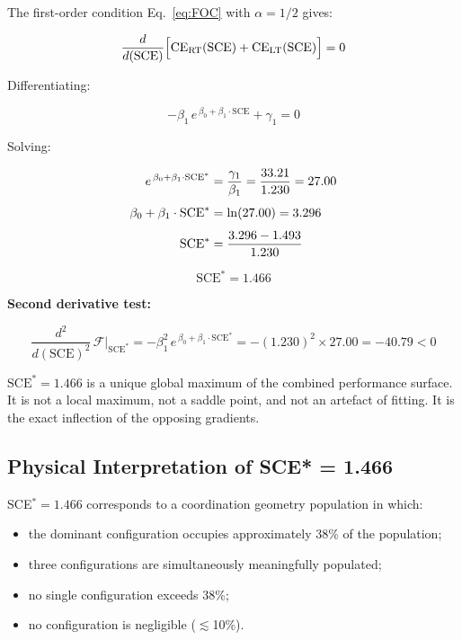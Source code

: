 \documentclass[11pt]{article}
\theoremstyle{plain}
\theoremstyle{definition}
\theoremstyle{remark}
\begin{document}
The first-order condition Eq.~\eqref{eq:FOC} with $\alpha = 1/2$ gives:

\begin{equation}
  \frac{d}{d(\mathrm{SCE})}\Bigl[
    \mathrm{CE}_{\mathrm{RT}}(\mathrm{SCE})
    + \mathrm{CE}_{\mathrm{LT}}(\mathrm{SCE})
  \Bigr] = 0
  \label{eq:FOC_explicit}
\end{equation}

Differentiating:

\begin{equation}
  -\beta_1\,e^{\,\beta_0 + \beta_1 \cdot \mathrm{SCE}} + \gamma_1 = 0
  \label{eq:diff_eq}
\end{equation}

Solving:

\begin{align}
  e^{\,\beta_0 + \beta_1 \cdot \mathrm{SCE}^{*}} &= \frac{\gamma_1}{\beta_1}
  = \frac{33.21}{1.230} = 27.00 \notag\\[4pt]
  \beta_0 + \beta_1 \cdot \mathrm{SCE}^{*} &= \ln(27.00) = 3.296 \notag\\[4pt]
  \mathrm{SCE}^{*} &= \frac{3.296 - 1.493}{1.230}
  \label{eq:SCE_star_derivation}
\end{align}

\begin{equation}
  \boxed{\mathrm{SCE}^{*} = 1.466}
  \label{eq:SCE_star}
\end{equation}

\noindent\textbf{Second derivative test:}

\begin{equation}
  \frac{d^2}{d(\mathrm{SCE})^2}\,\mathcal{F}\Big|_{\mathrm{SCE}^{*}}
  = -\beta_1^2\,e^{\,\beta_0 + \beta_1 \cdot \mathrm{SCE}^{*}}
  = -(1.230)^2 \times 27.00
  = -40.79 < 0
  \label{eq:SOC}
\end{equation}

$\mathrm{SCE}^{*} = 1.466$ is a unique global maximum of the combined performance
surface.  It is not a local maximum, not a saddle point, and not an artefact of
fitting.  It is the exact inflection of the opposing gradients.

\subsection{Physical Interpretation of SCE* = 1.466}

SCE$^{*} = 1.466$ corresponds to a coordination geometry population in which:
\begin{itemize}[leftmargin=2em]
  \item the dominant configuration occupies approximately 38\% of the population;
  \item three configurations are simultaneously meaningfully populated;
  \item no single configuration exceeds 38\%;
  \item no configuration is negligible ($\lesssim$10\%).
\end{itemize}
\end{document}
